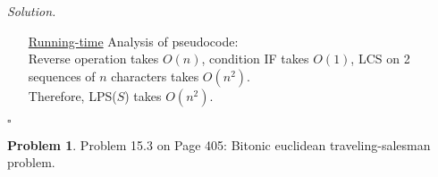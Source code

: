 \documentclass[11pt]{article}
\theoremstyle{definition}
\newtheorem{problem}{Problem}
\newenvironment{solution}{\noindent\emph{Solution.}}{\hfill$\square$}
\begin{document}
\begin{solution}
\begin{enumerate}
 \item[\underline{Running-time}]
Analysis of pseudocode:\\
Reverse operation takes $O(n)$, condition IF takes $O(1)$,  LCS on 2 sequences of $n$ characters takes $O(n^2)$.\\
Therefore, LPS($S$) takes $O(n^2)$.

   
   
  \end{enumerate}
\end{solution}

\clearpage






\begin{problem}
Problem 15.3 on Page 405: Bitonic euclidean traveling-salesman problem.
\end{problem}
\end{document}
